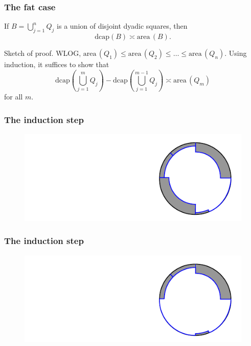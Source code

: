 \documentclass[xcolor=pdftex,dvipsnames,table]{beamer}
\newcommand{\area}{\text{area}\,}
\newcommand{\dcap}{\text{dcap}}
\theoremstyle{definition}
\begin{document}
\begin{frame}
  \frametitle{The fat case}
  \begin{lemma}
    If $B = \bigcup_{j=1}^n Q_j$ is a union of disjoint dyadic squares, then
    \[
        \dcap(B) \asymp \area(B).
    \]
  \end{lemma}
  {\color{blue} Sketch of proof.} WLOG, $\area(Q_1) \leq \area(Q_2) \leq \dots \leq \area(Q_n)$.
  Using induction, it suffices to show that
  \[
      \dcap \left( \bigcup_{j=1}^{m} Q_j \right) - \dcap \left( \bigcup_{j=1}^{m-1} Q_j \right) \asymp
      \area(Q_m)
  \]
  for all $m$.
\end{frame}

\begin{frame}
  \frametitle{The induction step}
  \begin{figure}
    \includegraphics[scale=1]{removeOneSquare_01.pdf}
  \end{figure}
\end{frame}

\begin{frame}
  \frametitle{The induction step}
  \begin{figure}
    \includegraphics[scale=1]{removeOneSquare_02.pdf}
  \end{figure}
\end{frame}
\end{document}
